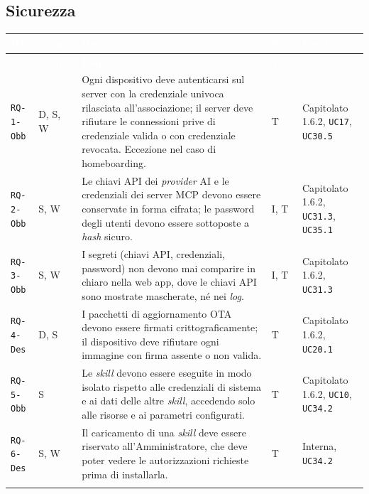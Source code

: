 \documentclass[12pt,a4paper]{article}
\newcommand{\thc}[1]{\textcolor{white}{\textbf{#1}}}
\newcommand{\rl}{\\ \arrayrulecolor{bfline}\hline}
\begin{document}
\subsection{Sicurezza}
\begin{longtable}{>{\raggedright\arraybackslash}p{}>{\centering\arraybackslash}p{}>{\raggedright\arraybackslash}p{}>{\centering\arraybackslash}p{}>{\raggedright\arraybackslash}p{}}
\rowcolor{bfblue}\thc{ID} & \thc{Comp.} & \thc{Requisito} & \thc{Ver.} & \thc{Fonti} \\ \endfirsthead
\rowcolor{bfblue}\thc{ID} & \thc{Comp.} & \thc{Requisito} & \thc{Ver.} & \thc{Fonti} \\ \endhead
\texttt{RQ-1-Obb} & D, S, W & Ogni dispositivo deve autenticarsi sul server con la credenziale univoca rilasciata all'associazione; il server deve rifiutare le connessioni prive di credenziale valida o con credenziale revocata. Eccezione nel caso di homeboarding. & T & Capitolato 1.6.2, \texttt{UC17}, \texttt{UC30.5} \rl

\texttt{RQ-2-Obb} & S, W & Le chiavi API dei \emph{provider} AI e le credenziali dei server MCP devono essere conservate in forma cifrata; le password degli utenti devono essere sottoposte a \emph{hash} sicuro. & I, T & Capitolato 1.6.2, \texttt{UC31.3}, \texttt{UC35.1} \rl

\texttt{RQ-3-Obb} & S, W & I segreti (chiavi API, credenziali, password) non devono mai comparire in chiaro nella web app, dove le chiavi API sono mostrate mascherate, né nei \emph{log}. & I, T & Capitolato 1.6.2, \texttt{UC31.3} \rl

\texttt{RQ-4-Des} & D, S & I pacchetti di aggiornamento OTA devono essere firmati crittograficamente; il dispositivo deve rifiutare ogni immagine con firma assente o non valida. & T & Capitolato 1.6.2, \texttt{UC20.1} \rl

\texttt{RQ-5-Obb} & S & Le \emph{skill} devono essere eseguite in modo isolato rispetto alle credenziali di sistema e ai dati delle altre \emph{skill}, accedendo solo alle risorse e ai parametri configurati. & T & Capitolato 1.6.2, \texttt{UC10}, \texttt{UC34.2} \rl

\texttt{RQ-6-Des} & S, W & Il caricamento di una \emph{skill} deve essere riservato all'Amministratore, che deve poter vedere le autorizzazioni richieste prima di installarla. & T & Interna, \texttt{UC34.2} \rl


\end{longtable}
\end{document}
